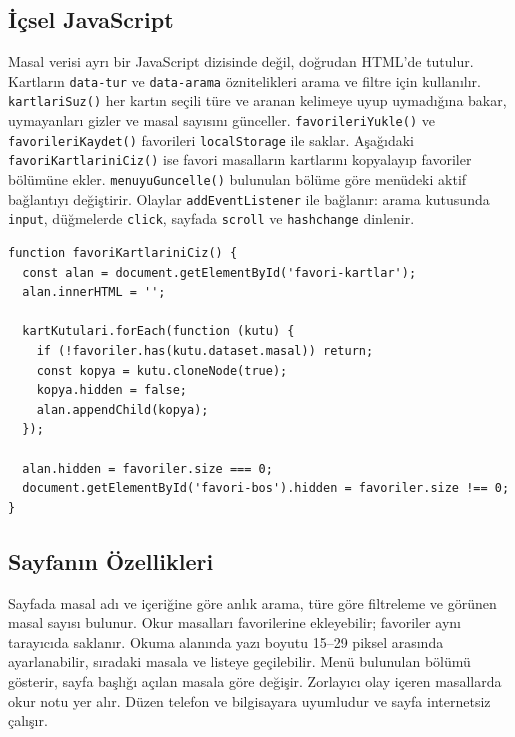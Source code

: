 \documentclass[12pt,a4paper]{article}
\begin{document}
\subsection{İçsel JavaScript}
Masal verisi ayrı bir JavaScript dizisinde değil, doğrudan HTML'de tutulur. Kartların \texttt{data-tur} ve \texttt{data-arama} öznitelikleri arama ve filtre için kullanılır. \texttt{kartlariSuz()} her kartın seçili türe ve aranan kelimeye uyup uymadığına bakar, uymayanları gizler ve masal sayısını günceller. \texttt{favorileriYukle()} ve \texttt{favorileriKaydet()} favorileri \texttt{localStorage} ile saklar. Aşağıdaki \texttt{favoriKartlariniCiz()} ise favori masalların kartlarını kopyalayıp favoriler bölümüne ekler. \texttt{menuyuGuncelle()} bulunulan bölüme göre menüdeki aktif bağlantıyı değiştirir. Olaylar \texttt{addEventListener} ile bağlanır: arama kutusunda \texttt{input}, düğmelerde \texttt{click}, sayfada \texttt{scroll} ve \texttt{hashchange} dinlenir.

\begin{lstlisting}[caption={İçsel JavaScript'ten önemli bir bölüm}]
function favoriKartlariniCiz() {
  const alan = document.getElementById('favori-kartlar');
  alan.innerHTML = '';

  kartKutulari.forEach(function (kutu) {
    if (!favoriler.has(kutu.dataset.masal)) return;
    const kopya = kutu.cloneNode(true);
    kopya.hidden = false;
    alan.appendChild(kopya);
  });

  alan.hidden = favoriler.size === 0;
  document.getElementById('favori-bos').hidden = favoriler.size !== 0;
}
\end{lstlisting}

\subsection{Sayfanın Özellikleri}
Sayfada masal adı ve içeriğine göre anlık arama, türe göre filtreleme ve görünen masal sayısı bulunur. Okur masalları favorilerine ekleyebilir; favoriler aynı tarayıcıda saklanır. Okuma alanında yazı boyutu 15--29 piksel arasında ayarlanabilir, sıradaki masala ve listeye geçilebilir. Menü bulunulan bölümü gösterir, sayfa başlığı açılan masala göre değişir. Zorlayıcı olay içeren masallarda okur notu yer alır. Düzen telefon ve bilgisayara uyumludur ve sayfa internetsiz çalışır.


\end{document}
